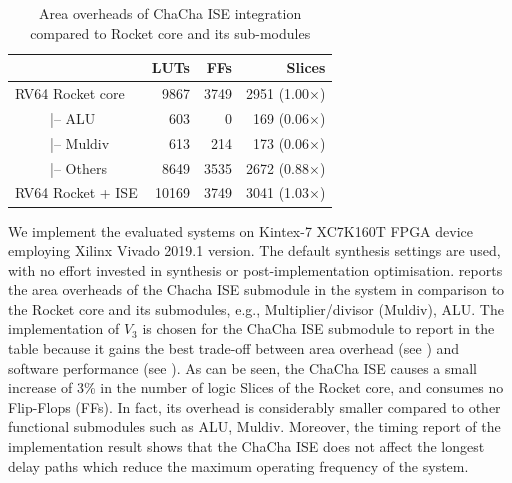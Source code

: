 \begin{table}
	\caption{Area overheads of ChaCha ISE integration compared to Rocket core and its sub-modules}
	\label{tab:res:hardcost2}
    \centering
	\begin{tabular}{lrrr}
		\toprule            
		                 &     LUTs   &   FFs  &   Slices \\
		\midrule
		RV64 Rocket core  &    9867   &  3749  & 2951 (1.00$\times$)\\
		~~~~~|-- ALU      &     603   &     0  &  169 (0.06$\times$) \\
		~~~~~|-- Muldiv   &     613   &   214  &  173 (0.06$\times$)\\
		~~~~~|-- Others   &    8649   &  3535  & 2672 (0.88$\times$)\\
		RV64 Rocket + ISE &   10169   &  3749  & 3041 (1.03$\times$)\\ 
		
		\bottomrule
	\end{tabular} 
\end{table}

We implement the evaluated systems on Kintex-7 XC7K160T FPGA device employing Xilinx Vivado 2019.1 version. 
The default synthesis settings are used, with no effort invested in synthesis or post-implementation optimisation.
 reports the area overheads of the Chacha ISE submodule in the system in comparison to the Rocket core and its submodules, e.g., Multiplier/divisor (Muldiv), ALU. 
The implementation of $V_3$ is chosen for the ChaCha ISE submodule to report in the table because it gains the best trade-off between area overhead (see ) and software performance (see ). 
As can be seen, 
the ChaCha ISE causes a small increase of 3\% in the number of logic Slices of the Rocket core, and consumes no Flip-Flops (FFs). 
In fact, its overhead is considerably smaller compared to other functional submodules such as ALU, Muldiv. 
Moreover, the timing report of the implementation result shows that the ChaCha ISE does not affect the longest delay paths which reduce the maximum operating frequency of the system.



